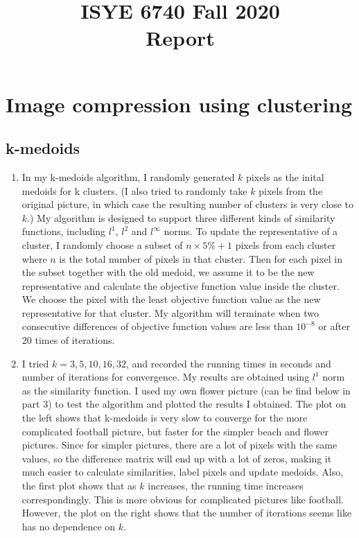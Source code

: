 \documentclass[twoside,10pt]{article}
\begin{document}
\title{ISYE 6740 Fall 2020\\ Report}
\date{}

\maketitle
\section{Image compression using clustering}

\subsection{k-medoids}
\begin{enumerate}
    \item In my k-medoids algorithm, I randomly generated $k$ pixels as the inital medoids for k clusters. (I also tried to randomly take $k$ pixels from the original picture, in which case the resulting number of clusters is very close to $k$.) My algorithm is designed to support three different kinds of similarity functions, including $l^1$, $l^2$ and $l^{\infty}$ norms. To update the representative of a cluster, I randomly choose a subset of $n\times 5\% + 1$ pixels from each cluster where $n$ is the total number of pixels in that cluster. Then for each pixel in the subset together with the old medoid, we assume it to be the new representative and calculate the objective function value inside the cluster. We choose the pixel with the least objective function value as the new representative for that cluster. My algorithm will terminate when two consecutive differences of objective function values are less than $10^{-8}$ or after 20 times of iterations. 
    
    \item I tried $k = 3,5,10,16,32$, and recorded the running times in seconds and number of iterations for convergence. My results are obtained using $l^1$ norm as the similarity function. I used my own flower picture (can be find below in part 3) to test the algorithm and plotted the results I obtained. The plot on the left shows that k-medoids is very slow to converge for the more complicated football picture, but faster for the simpler beach and flower pictures. Since for simpler pictures, there are a lot of pixels with the same values, so the difference matrix will end up with a lot of zeros, making it much easier to calculate similarities, label pixels and update medoids. Also, the first plot shows that as $k$ increases, the running time increases correspondingly. This is more obvious for complicated pictures like football. However, the plot on the right shows that the number of iterations seems like has no dependence on $k$. 
    

\end{enumerate}
\end{document}
